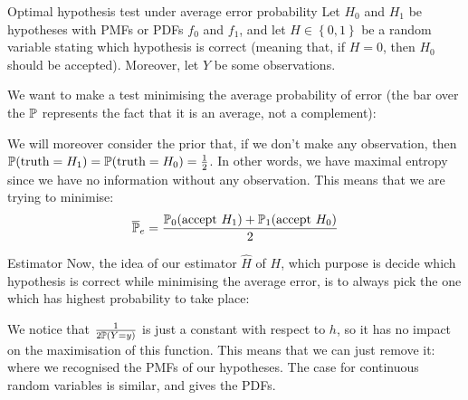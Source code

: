 \documentclass[a4paper]{article}
\begin{document}
\begin{parag}{Optimal hypothesis test under average error probability}
    Let $H_0$ and $H_1$ be hypotheses with PMFs or PDFs $f_0$ and $f_1$, and let $H \in \left\{0, 1\right\}$ be a random variable stating which hypothesis is correct (meaning that, if $H = 0$, then $H_0$ should be accepted). Moreover, let $Y$ be some observations.

    We want to make a test minimising the average probability of error (the bar over the $\mathbb{P}$ represents the fact that it is an average, not a complement): 

    We will moreover consider the prior that, if we don't make any observation, then $\prob\left(\text{truth} = H_1\right) = \prob\left(\text{truth} = H_0\right) = \frac{1}{2}$. In other words, we have maximal entropy since we have no information without any observation. This means that we are trying to minimise:
    \[\bar{\prob}_e = \frac{\prob_0\left(\text{accept $H_1$}\right) + \prob_1\left(\text{accept $H_0$}\right)}{2}\]

    \begin{subparag}{Estimator}
        Now, the idea of our estimator $\hat{H}$ of $H$, which purpose is decide which hypothesis is correct while minimising the average error, is to always pick the one which has highest probability to take place:
        
        We notice that $\frac{1}{2\prob\left(Y = y\right)}$ is just a constant with respect to $h$, so it has no impact on the maximisation of this function. This means that we can just remove it: 
        where we recognised the PMFs of our hypotheses. The case for continuous random variables is similar, and gives the PDFs.
    \end{subparag}
    

\end{parag}
\end{document}
